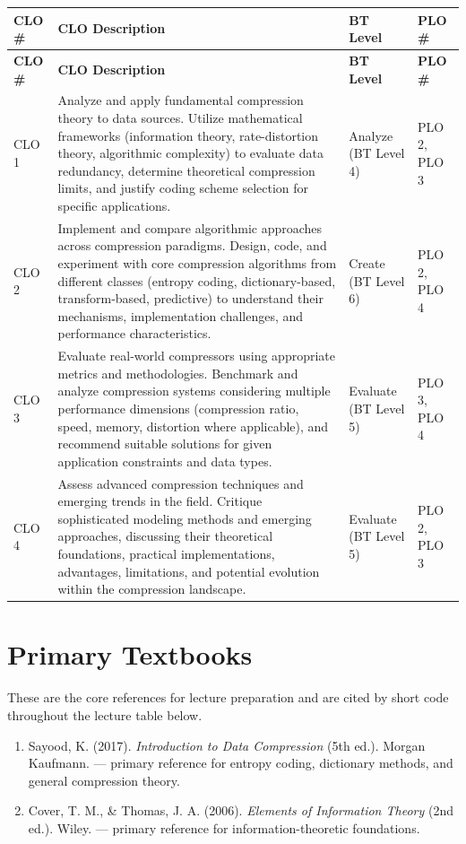 \documentclass{article}
\begin{document}
\renewcommand{\arraystretch}{1.4}
\begin{longtable}{|l|p{9cm}|p{2.7cm}|p{2.2cm}|}
\hline
\textbf{CLO \#}  & \textbf{CLO Description} & \textbf{BT Level} & \textbf{PLO \#}\\ \hline
\endfirsthead
\hline
\textbf{CLO \#}  & \textbf{CLO Description} & \textbf{BT Level} & \textbf{PLO \#}\\ \hline
\endhead
CLO 1 & Analyze and apply fundamental compression theory to data sources. Utilize mathematical frameworks (information theory, rate-distortion theory, algorithmic complexity) to evaluate data redundancy, determine theoretical compression limits, and justify coding scheme selection for specific applications. & Analyze (BT Level 4) & PLO 2, PLO 3 \\ \hline
CLO 2 & Implement and compare algorithmic approaches across compression paradigms. Design, code, and experiment with core compression algorithms from different classes (entropy coding, dictionary-based, transform-based, predictive) to understand their mechanisms, implementation challenges, and performance characteristics. & Create (BT Level 6) & PLO 2, PLO 4 \\ \hline
CLO 3 & Evaluate real-world compressors using appropriate metrics and methodologies. Benchmark and analyze compression systems considering multiple performance dimensions (compression ratio, speed, memory, distortion where applicable), and recommend suitable solutions for given application constraints and data types. & Evaluate (BT Level 5) & PLO 3, PLO 4 \\ \hline
CLO 4 & Assess advanced compression techniques and emerging trends in the field. Critique sophisticated modeling methods and emerging approaches, discussing their theoretical foundations, practical implementations, advantages, limitations, and potential evolution within the compression landscape. & Evaluate (BT Level 5) & PLO 2, PLO 3 \\ \hline
\end{longtable}

\section*{Primary Textbooks}
These are the core references for lecture preparation and are cited by short code throughout the lecture table below.
\begin{enumerate}
    \item[{[IDC]}] Sayood, K. (2017). \textit{Introduction to Data Compression} (5th ed.). Morgan Kaufmann. --- primary reference for entropy coding, dictionary methods, and general compression theory.
    \item[{[EIT]}] Cover, T. M., \& Thomas, J. A. (2006). \textit{Elements of Information Theory} (2nd ed.). Wiley. --- primary reference for information-theoretic foundations.
\end{enumerate}
\end{document}
